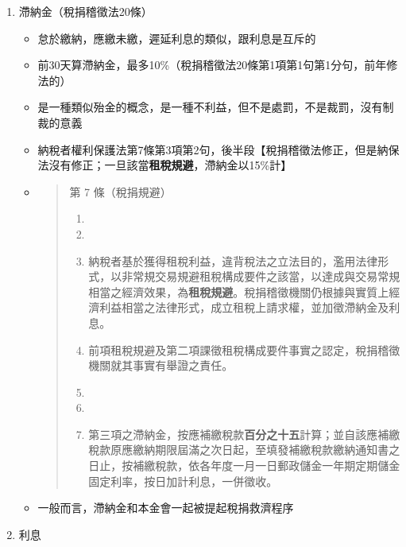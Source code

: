 \documentclass[]{ctexbook}
\providecommand{\tightlist}{%
  \setlength{\itemsep}{0pt}\setlength{\parskip}{0pt}}
\begin{document}
\begin{enumerate}
\def\labelenumi{\arabic{enumi}.}
\tightlist
\item
  滯納金（稅捐稽徵法20條）

  \begin{itemize}
  \item
    怠於繳納，應繳未繳，遲延利息的類似，跟利息是互斥的
  \item
    前30天算滯納金，最多10\%（稅捐稽徵法20條第1項第1句第1分句，前年修法的）
  \item
    是一種類似殆金的概念，是一種不利益，但不是處罰，不是裁罰，沒有制裁的意義
  \item
    納稅者權利保護法第7條第3項第2句，後半段【稅捐稽徵法修正，但是納保法沒有修正；一旦該當\textbf{租稅規避}，滯納金以15\%計】
  \item
    \begin{quote}
    第 7 條（稅捐規避）

    \begin{enumerate}
    \def\labelenumii{\arabic{enumii}.}
    \tightlist
    \item
    \item
    \item
      納稅者基於獲得租稅利益，違背稅法之立法目的，濫用法律形式，以非常規交易規避租稅構成要件之該當，以達成與交易常規相當之經濟效果，為\textbf{租稅規避}。稅捐稽徵機關仍根據與實質上經濟利益相當之法律形式，成立租稅上請求權，並加徵滯納金及利息。
    \item
      前項租稅規避及第二項課徵租稅構成要件事實之認定，稅捐稽徵機關就其事實有舉證之責任。
    \item
    \item
    \item
      第三項之滯納金，按應補繳稅款\textbf{百分之十五}計算；並自該應補繳稅款原應繳納期限屆滿之次日起，至填發補繳稅款繳納通知書之日止，按補繳稅款，依各年度一月一日郵政儲金一年期定期儲金固定利率，按日加計利息，一併徵收。
    \end{enumerate}
    \end{quote}
  \item
    一般而言，滯納金和本金會一起被提起稅捐救濟程序
  \end{itemize}
\item
  利息


\end{enumerate}
\end{document}
